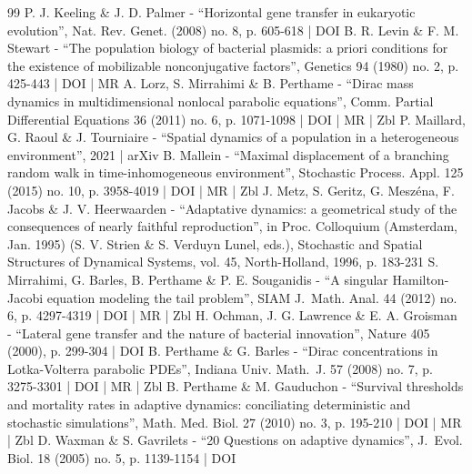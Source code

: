 \documentclass[10pt]{amsart}
\theoremstyle{plain}
\theoremstyle{remark}
\begin{document}
\begin{thebibliography}{99}
P. J. Keeling \& J. D. Palmer - “Horizontal gene transfer in eukaryotic evolution”, Nat. Rev. Genet. (2008) no. 8, p. 605-618 | DOI
B. R. Levin \& F. M. Stewart - “The population biology of bacterial plasmids: a priori conditions for the existence of mobilizable nonconjugative factors”, Genetics 94 (1980) no. 2, p. 425-443 | DOI | MR
A. Lorz, S. Mirrahimi \& B. Perthame - “Dirac mass dynamics in multidimensional nonlocal parabolic equations”, Comm. Partial Differential Equations 36 (2011) no. 6, p. 1071-1098 | DOI | MR | Zbl
P. Maillard, G. Raoul \& J. Tourniaire - “Spatial dynamics of a population in a heterogeneous environment”, 2021 | arXiv
B. Mallein - “Maximal displacement of a branching random walk in time-inhomogeneous environment”, Stochastic Process. Appl. 125 (2015) no. 10, p. 3958-4019 | DOI | MR | Zbl
J. Metz, S. Geritz, G. Meszéna, F. Jacobs \& J. V. Heerwaarden - “Adaptative dynamics: a geometrical study of the consequences of nearly faithful reproduction”, in Proc. Colloquium (Amsterdam, Jan. 1995) (S. V. Strien \& S. Verduyn Lunel, eds.), Stochastic and Spatial Structures of Dynamical Systems, vol. 45, North-Holland, 1996, p. 183-231
S. Mirrahimi, G. Barles, B. Perthame \& P. E. Souganidis - “A singular Hamilton-Jacobi equation modeling the tail problem”, SIAM J. Math. Anal. 44 (2012) no. 6, p. 4297-4319 | DOI | MR | Zbl
H. Ochman, J. G. Lawrence \& E. A. Groisman - “Lateral gene transfer and the nature of bacterial innovation”, Nature 405 (2000), p. 299-304 | DOI
B. Perthame \& G. Barles - “Dirac concentrations in Lotka-Volterra parabolic PDEs”, Indiana Univ. Math. J. 57 (2008) no. 7, p. 3275-3301 | DOI | MR | Zbl
B. Perthame \& M. Gauduchon - “Survival thresholds and mortality rates in adaptive dynamics: conciliating deterministic and stochastic simulations”, Math. Med. Biol. 27 (2010) no. 3, p. 195-210 | DOI | MR | Zbl
D. Waxman \& S. Gavrilets - “20 Questions on adaptive dynamics”, J. Evol. Biol. 18 (2005) no. 5, p. 1139-1154 | DOI
\end{thebibliography}
\end{document}
